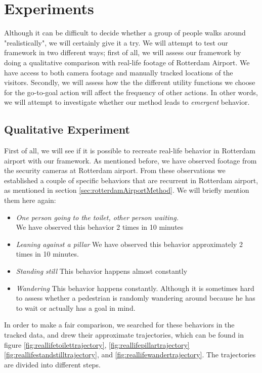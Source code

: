 \documentclass[11pt, a4paper]{book}
\begin{document}
 



\chapter{Experiments}
\label{chap:experiments}
Although it can be difficult to decide whether a group of people walks around "realistically", we will certainly give it a try. We will attempt to test our framework in two different ways; first of all, we will assess our framework by doing a qualitative comparison with real-life footage of Rotterdam Airport. We have access to both camera footage and manually tracked locations of the visitors.
Secondly, we will assess how the the different utility functions we choose for the go-to-goal action will affect the frequency of other actions. In other words, we will attempt to investigate whether our method leads to \emph{emergent} behavior.

\section{Qualitative Experiment}
First of all, we will see if it is possible to recreate real-life behavior in Rotterdam airport with our framework. As mentioned before, we have observed footage from the security cameras at Rotterdam airport. From these observations we established a couple of specific behaviors that are recurrent in Rotterdam airport, as mentioned in section \ref{sec:rotterdamAirportMethod}. We will briefly mention them here again:
\begin{itemize}
\item \emph{One person going to the toilet, other person waiting.}\\
We have observed this behavior 2 times in 10 minutes
\item \emph{Leaning against a pillar}
We have observed this behavior approximately 2 times in 10 minutes.
\item \emph{Standing still}
This behavior happens almost constantly
\item \emph{Wandering}
This behavior happens constantly. Although it is sometimes hard to assess whether a pedestrian is randomly wandering around because he has to wait or actually has a goal in mind.
\end{itemize}

In order to make a fair comparison, we searched for these behaviors in the tracked data, and drew their approximate trajectories, which can be found in figure \ref{fig:reallifetoilettrajectory}, \ref{fig:reallifepillartrajectory} \ref{fig:reallifestandstilltrajectory}, and \ref{fig:reallifewandertrajectory}. The trajectories are divided into different steps.
\end{document}
